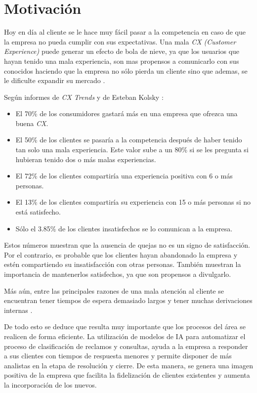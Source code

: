 
\section{Motivación}

Hoy en día al cliente se le hace muy fácil pasar a la competencia en caso de que la empresa no pueda cumplir con sus expectativas. Una mala \textit{CX (Customer Experience)} puede generar un efecto de bola de nieve, ya que los usuarios que hayan tenido una mala experiencia, son mas propensos a comunicarlo con sus conocidos haciendo que la empresa no sólo pierda un cliente sino que ademas, se le dificulte expandir su mercado \citep{WEBSITE:9}.

Según informes de \textit{CX Trends} \citep{cxtrends}\citep{WEBSITE:4}\citep{WEBSITE:10} y de Esteban Kolsky \citep{WEBSITE:11}:

\begin{itemize}
\item El 70\% de los consumidores gastará más en una empresa que ofrezca una buena \textit{CX}.
\item El 50\% de los clientes se pasaría a la competencia después de haber tenido tan solo una mala experiencia. Este valor sube a un 80\% si se les pregunta si hubieran tenido dos o más malas experiencias.
\item El 72\% de los clientes compartiría una experiencia positiva con 6 o más personas.
\item El 13\% de los clientes compartiría su experiencia con 15 o más personas si no está satisfecho.
\item Sólo el 3.85\% de los clientes insatisfechos se lo comunican a la empresa.
\end{itemize}

Estos números muestran que la ausencia de quejas no es un signo de satisfacción. Por el contrario, es probable que los clientes hayan abandonado la empresa y estén compartiendo su insatisfacción con otras personas. También muestran la importancia de mantenerlos satisfechos, ya que son propensos a divulgarlo.

Más aún, entre las principales razones de una mala atención al cliente se encuentran tener tiempos de espera demasiado largos \citep{WEBSITE:12} y tener muchas derivaciones internas \citep{WEBSITE:13}.

De todo esto se deduce que resulta muy importante que los procesos del área se realicen de forma eficiente. La utilización de modelos de IA para automatizar el proceso de clasificación de reclamos y consultas, ayuda a la empresa a responder a sus clientes con tiempos de respuesta menores y permite disponer de más analistas en la etapa de resolución y cierre. De esta manera, se genera una imagen positiva de la empresa que facilita la fidelización de clientes existentes y aumenta la incorporación de los nuevos.

